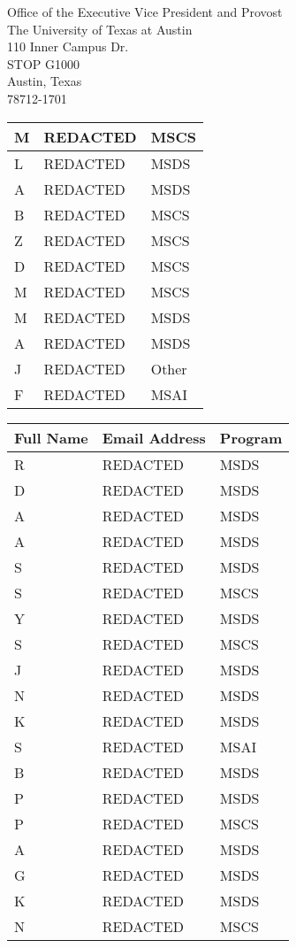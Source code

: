 \documentclass[11pt]{letter}
\begin{document}
\begin{letter}{Office of the Executive Vice President and Provost \\ The University of Texas at Austin \\ 110 Inner Campus Dr. \\ STOP G1000 \\ Austin, Texas \\ 78712-1701}
\begin{tabular}{|p{5cm}|p{6.7cm}|p{2.25cm}|}
        M & REDACTED & MSCS \\ \hline
        L & REDACTED & MSDS \\ \hline
        A & REDACTED & MSDS \\ \hline
        B & REDACTED & MSCS \\ \hline
        Z & REDACTED & MSCS \\ \hline
        D & REDACTED & MSCS \\ \hline
        M & REDACTED & MSCS \\ \hline
        M & REDACTED & MSDS \\ \hline
        A & REDACTED & MSDS \\ \hline
        J & REDACTED & Other \\ \hline
        F & REDACTED & MSAI \\ \hline
    \end{tabular}
    \centering
    \begin{tabular}{|p{5cm}|p{6.7cm}|p{2.25cm}|}
        \hline
        \textbf{Full Name} & \textbf{Email Address} & \textbf{Program} \\ \hline
        R & REDACTED & MSDS \\ \hline
        D & REDACTED & MSDS \\ \hline
        A & REDACTED & MSDS \\ \hline
        A & REDACTED & MSDS \\ \hline
        S & REDACTED & MSDS \\ \hline
        S & REDACTED & MSCS \\ \hline
        Y & REDACTED & MSDS \\ \hline
        S & REDACTED & MSCS \\ \hline
        J & REDACTED & MSDS \\ \hline
        N & REDACTED & MSDS \\ \hline
        K & REDACTED & MSDS \\ \hline
        S & REDACTED & MSAI \\ \hline
        B & REDACTED & MSDS \\ \hline
        P & REDACTED & MSDS \\ \hline
        P & REDACTED & MSCS \\ \hline
        A & REDACTED & MSDS \\ \hline
        G & REDACTED & MSDS \\ \hline
        K & REDACTED & MSDS \\ \hline
        N & REDACTED & MSCS \\ \hline

\end{tabular}
\end{letter}
\end{document}
